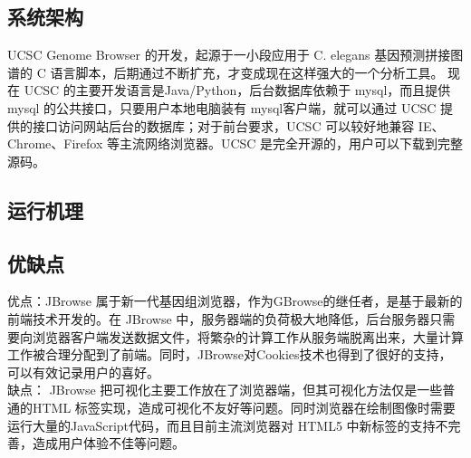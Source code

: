 		\subsection{系统架构}
		UCSC Genome Browser 的开发，起源于一小段应用于 C. elegans 基因预测拼接图谱的 C 语言脚本，后期通过不断扩充，才变成现在这样强大的一个分析工具。 现在 UCSC 的主要开发语言是Java/Python，后台数据库依赖于 mysql，而且提供mysql 的公共接口，只要用户本地电脑装有 mysql客户端，就可以通过 UCSC 提供的接口访问网站后台的数据库；对于前台要求，UCSC 可以较好地兼容 IE、Chrome、Firefox 等主流网络浏览器。UCSC 是完全开源的，用户可以下载到完整源码。
		\subsection{运行机理}
		\subsection{优缺点}
		优点：JBrowse 属于新一代基因组浏览器，作为GBrowse的继任者，是基于最新的前端技术开发的。在 JBrowse 中，服务器端的负荷极大地降低，后台服务器只需要向浏览器客户端发送数据文件，将繁杂的计算工作从服务端脱离出来，大量计算工作被合理分配到了前端。同时，JBrowse对Cookies技术也得到了很好的支持，可以有效记录用户的喜好。\\
		\indent 缺点： JBrowse 把可视化主要工作放在了浏览器端，但其可视化方法仅是一些普通的HTML 标签实现，造成可视化不友好等问题。同时浏览器在绘制图像时需要运行大量的JavaScript代码，而且目前主流浏览器对 HTML5 中新标签的支持不完善，造成用户体验不佳等问题。